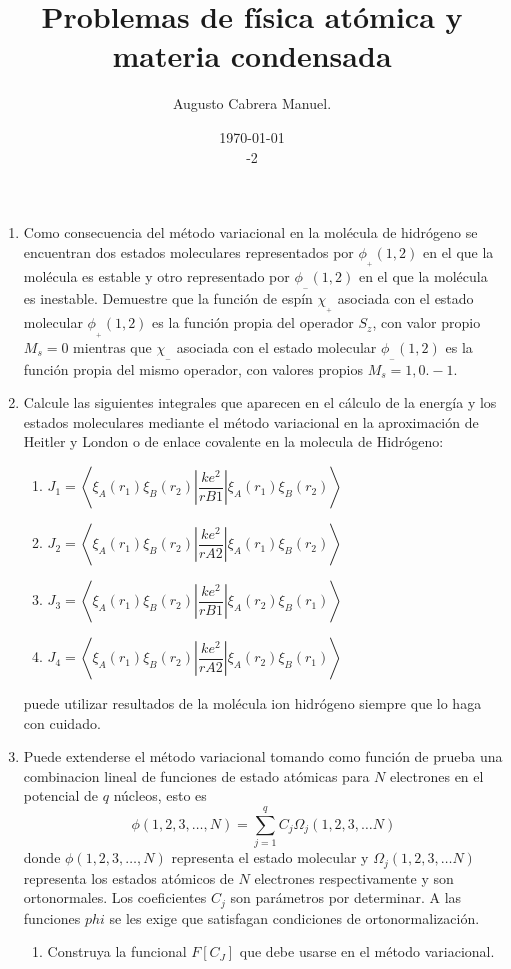 \documentclass[]{article}
\title{Problemas de física atómica y materia condensada}
\author{Augusto Cabrera Manuel.}
\date{\today\\ \ser 6 \sem 2018-2 }
\begin{document}
\maketitle
\begin{enumerate}
\item Como consecuencia del método variacional en la molécula de hidrógeno se encuentran dos estados moleculares representados por $\phi_{_{+}}(1,2)$ en el que la molécula es estable  y otro representado por $\phi_{_{-}}(1,2)$ en el que la molécula es inestable. Demuestre que la función de espín $\chi_{_{+}}$ asociada con el estado molecular $\phi_{_{+}}(1,2)$ es la función propia del operador $S_z$, con valor propio $M_s=0$ mientras que $\chi_{_{-}}$ asociada con el estado molecular $\phi_{_{-}}(1,2)$ es la función propia del mismo operador, con valores propios $M_s=1,0.-1$.
\item Calcule las siguientes integrales que aparecen en el cálculo de la energía y los estados moleculares  mediante el método variacional en la aproximación de Heitler y London o de enlace covalente en la molecula de Hidrógeno:
  \begin{enumerate}
  \item  $J_1=\left<\xi_A(r_1)\xi_B(r_2)\left|\dfrac{ke^2}{r{B1}}\right|\xi_A(r_1)\xi_B(r_2)\right>$
  \item $J_2=\left<\xi_A(r_1)\xi_B(r_2)\left|\dfrac{ke^2}{r{A2}}\right|\xi_A(r_1)\xi_B(r_2)\right>$
  \item $J_3=\left<\xi_A(r_1)\xi_B(r_2)\left|\dfrac{ke^2}{r{B1}}\right|\xi_A(r_2)\xi_B(r_1)\right>$
  \item $J_4=\left<\xi_A(r_1)\xi_B(r_2)\left|\dfrac{ke^2}{r{A2}}\right|\xi_A(r_2)\xi_B(r_1)\right>$
  \end{enumerate}
puede utilizar resultados de la molécula ion hidrógeno siempre que lo haga con cuidado.
\item Puede extenderse el método variacional tomando como función de prueba una combinacion lineal de funciones de estado atómicas para $N$ electrones en el potencial de $q$ núcleos, esto es 
$$
\phi(1,2,3,\dots ,N)=\sum_{j=1}^qC_j\Omega_j(1,2,3,\dots N)
$$
donde $\phi(1,2,3,\dots ,N)$ representa el estado molecular y $\Omega_j(1,2,3,\dots N)$ representa los estados atómicos de $N$ electrones respectivamente y son ortonormales. Los coeficientes $C_j$ son parámetros por determinar. A las funciones $phi$ se les exige que satisfagan condiciones de ortonormalización.
\begin{enumerate}
\item Construya la funcional $F[C_J]$ que debe usarse en el método variacional.

\end{enumerate}
\end{enumerate}
\end{document}
